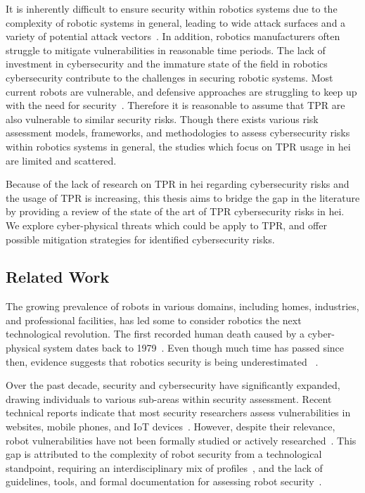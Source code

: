 It is inherently difficult to ensure security within robotics systems due to the complexity of robotic systems in general, leading to
wide
attack surfaces
and a variety
of potential attack vectors~\cite[2]{robot_security_review_2022}. In addition, robotics manufacturers often struggle to mitigate
vulnerabilities in reasonable time periods. The lack of investment in cybersecurity and the
immature state of the field in robotics cybersecurity contribute
to the challenges in securing robotic systems.
Most current robots are vulnerable, and defensive approaches are struggling
to keep up with the need for security~\cite[12]{robot_security_review_2022}. Therefore it is reasonable to assume that \ac{TPR} are also
vulnerable to similar security risks. Though there exists various risk assessment models, frameworks, and methodologies to assess
cybersecurity risks within robotics systems in general, the studies which focus on \ac{TPR} usage in \ac{hei} are limited and scattered.

Because of the lack of research on \ac{TPR} in \ac{hei} regarding cybersecurity risks and the usage of \ac{TPR}
is increasing, this thesis aims to bridge the gap in the literature by providing a review of the state of the art of
\ac{TPR} cybersecurity risks in \ac{hei}. We explore cyber-physical threats which could be apply to \ac{TPR}, and offer possible
mitigation strategies for identified cybersecurity risks.

\subsection{Related Work}
The growing prevalence of robots in various domains, including homes, industries, and professional facilities, has led some to
consider robotics the next technological revolution. The first recorded human death caused by a cyber-physical system
dates back to 1979~\cite[2]{robot_security_review_2022}. Even though much time has passed since then, evidence suggests that robotics security is being underestimated
~\cite[1-2]{
  robot_security_framework_2018}.

Over the past decade, security and cybersecurity have significantly expanded, drawing individuals to various sub-areas within security
assessment. Recent technical reports indicate that most security researchers assess vulnerabilities in
websites, mobile phones, and \ac{IoT} devices~\cite[]{dbir_2022, robot_security_review_2022}.
However, despite their relevance, robot vulnerabilities have not been formally studied or actively researched~\cite[1]{robot_security_review_2022}. This gap is attributed to the complexity of robot security from a
technological standpoint, requiring an interdisciplinary mix of profiles~\cite[74-77]{introduction_to_robot_system_security_2021}, and the lack of guidelines, tools, and formal documentation
for assessing robot security~\cite[7]{cyber_security_issues_in_robotics_2021}.


